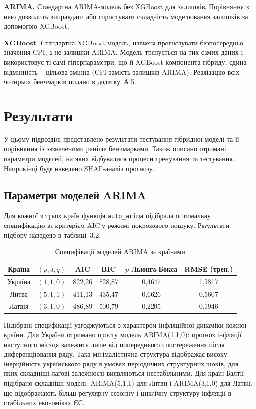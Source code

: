 \documentclass{bachelor_thesis}
\begin{document}
\textbf{ARIMA.} Стандартна ARIMA-модель без XGBoost для залишків. Порівняння з нею дозволить виправдати або спростувати складність моделювання залишків за допомогою XGBoost.

\textbf{XGBoost.} Стандартна XGBoost-модель, навчена прогнозувати безпосередньо значення CPI, а не залишки ARIMA. Модель тренується на тих самих даних і використовує ті самі гіперпараметри, що й XGBoost-компонента гібриду; єдина відмінність -- цільова змінна (CPI замість залишків ARIMA). Реалізацію всіх чотирьох бенчмарків подано в додатку~А.5.

\section{Результати}

У цьому підрозділі представлено результати тестування гібридної моделі та її порівняння із зазначеними раніше бенчмарками. Також описано отримані параметри моделей, на яких відбувалися процеси тренування та тестування. Наприкінці буде наведено SHAP-аналіз прогнозу.

\subsection{Параметри моделей ARIMA}

Для кожної з трьох країн функція \texttt{auto\_arima} підібрала оптимальну специфікацію за критерієм AIC у режимі покрокового пошуку. Результати підбору наведено в таблиці~3.2.

\begin{table}[h!]
\centering
\begin{tabular}{|c|c|c|c|c|c|}
\hline
\textbf{Країна} & \textbf{$(p,d,q)$} & \textbf{AIC} & \textbf{BIC} & \textbf{$p$ Льюнга-Бокса} & \textbf{RMSE (трен.)} \\
\hline
Україна & $(1,1,0)$ & 822{,}26 & 828{,}87 & 0{,}4647 & 1{,}9817 \\
Литва   & $(5,1,1)$ & 411{,}13 & 435{,}47 & 0{,}6626 & 0{,}5607 \\
Латвія  & $(3,1,0)$ & 486{,}89 & 500{,}79 & 0{,}2205 & 0{,}6946 \\
\hline
\end{tabular}
\caption{Специфікації моделей ARIMA за країнами}
\end{table}

Підібрані специфікації узгоджуються з характером інфляційної динаміки кожної країни. Для України отримано просту модель ARIMA(1,1,0): прогноз інфляції наступного місяця залежить лише від попереднього спостереження після диференціювання ряду. Така мінімалістична структура відображає високу інерційність українського ряду в умовах періодичних структурних шоків, для яких складніші лагові залежності виявляються нестабільними. Для країн Балтії підібрано складніші моделі: ARIMA(5,1,1) для Литви і ARIMA(3,1,0) для Латвії, що відображають більш регулярну сезонну і циклічну структуру інфляції в стабільних економіках ЄС.
\end{document}
